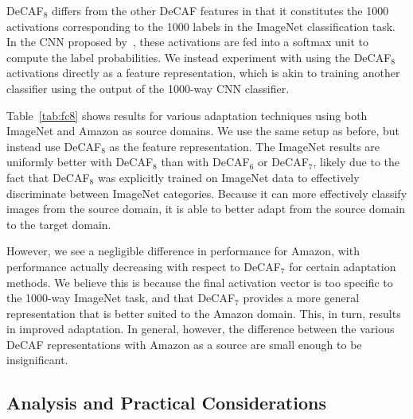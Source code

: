 DeCAF$_8$ differs from the other DeCAF features in that it constitutes the 1000
activations corresponding to the 1000 labels in the ImageNet classification
task. In the CNN proposed by~\cite{supervision}, these activations are fed into
a softmax unit to compute the label probabilities. We instead experiment with
using the DeCAF$_8$ activations directly as a feature representation, which is
akin to training another classifier using the output of the 1000-way CNN
classifier.

Table~\ref{tab:fc8} shows results for various adaptation techniques using both %
ImageNet and Amazon as source domains. We use the same setup as before, but
instead use DeCAF$_8$ as the feature representation. 
The ImageNet results are uniformly better with DeCAF$_8$ than with DeCAF$_6$ or
DeCAF$_7$, likely due to the fact that DeCAF$_8$ was explicitly
trained on ImageNet data to effectively discriminate between ImageNet categories.
Because it can more
effectively classify images from the source domain, it is able to better adapt
from the source domain to the target domain.

However, we see a negligible difference in performance for Amazon, with
performance actually decreasing with respect to DeCAF$_7$ for certain adaptation
methods. We believe this is because the final activation vector is too specific
to the 1000-way ImageNet task, and that DeCAF$_7$ provides a more general
representation that is better suited to the Amazon domain. This, in turn,
results in improved adaptation.
In general, however, the difference between the
various DeCAF representations with Amazon as a source are small enough to be
insignificant.

\subsection{Analysis and Practical Considerations}
\label{sec:analysis}




